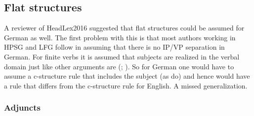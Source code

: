 \subsection{Flat structures}

A reviewer of HeadLex2016 suggested that flat structures could be assumed for German as well. The
first problem with this is that most authors working in HPSG and LFG follow \citet{Haider93a}
in assuming that there is no IP/VP separation in German. For finite verbs it is assumed that
subjects are realized in the verbal domain just like other arguments are (\citealp[Section~3.2.2, Section~3.2.3]{Berman2003a}; \citealp[]{ZK2002a}). So for German one would
have to assume a c-structure rule that includes the subject (as \citealp[]{ZK2002a} do) and
hence would have a rule that differs from the c-structure rule for English. A missed generalization.



\subsubsection{Adjuncts}

